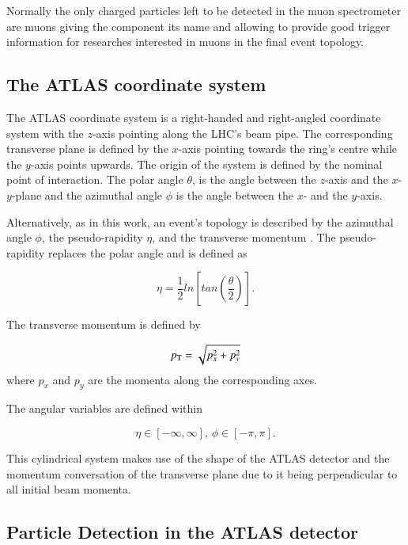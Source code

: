 Normally the only charged particles left to be detected in the muon spectrometer are muons giving the component its name and allowing to provide good trigger information for researches interested in muons in the final event topology.




\subsection{The ATLAS coordinate system}

The ATLAS coordinate system is a right-handed and right-angled coordinate system with the $z$-axis pointing along the LHC's beam pipe. The corresponding transverse plane is defined by the $x$-axis pointing towards the ring's centre while the $y$-axis points upwards. The origin of the system is defined by the nominal point of interaction. The polar angle $\theta$, is the angle between the $z$-axis and the $x$-$y$-plane and the azimuthal angle $\phi$ is the angle between the $x$- and the $y$-axis.

Alternatively, as in this work, an event's topology is described by the azimuthal angle $\phi$, the pseudo-rapidity $\eta$, and the transverse momentum \pT. The pseudo-rapidity replaces the polar angle and is defined as

\begin{equation}
\eta = \frac{1}{2} ln\left[ tan\left(\frac{\theta}{2}\right)\right].
\end{equation}

The transverse momentum is defined by

\begin{equation}
p_{\text{T}} = \sqrt{p_x^2 + p_y^2}
\end{equation}
where $p_x$ and $p_y$ are the momenta along the corresponding axes. 

The angular variables are defined within

\begin{equation}
\eta \in [-\infty,\infty],\,
\phi \in [-\pi,\pi].
\end{equation}

This cylindrical system makes use of the shape of the ATLAS detector and the momentum conversation of the transverse plane due to it being perpendicular to all initial beam momenta.

\subsection{Particle Detection in the ATLAS detector}

